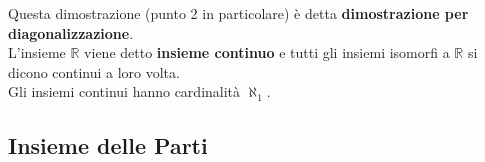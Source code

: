 Questa dimostrazione (punto 2 in particolare) è detta \textbf{dimostrazione per diagonalizzazione}.\\

L'insieme $\mathbb{R}$ viene detto \textbf{insieme continuo} e tutti gli insiemi isomorfi a $\mathbb{R}$ si dicono continui a loro volta.\\

Gli insiemi continui hanno cardinalità $\aleph_1$.\\

\subsection{Insieme delle Parti}







